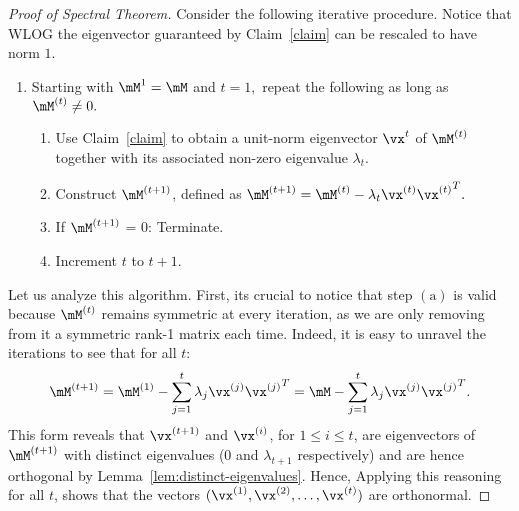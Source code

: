 \begin{proof}[Proof of Spectral Theorem]
Consider the following iterative procedure. Notice that WLOG the eigenvector guaranteed by Claim~\ref{claim} can be rescaled to have norm $1$.
\begin{enumerate}
\item Starting with $\mM^{1} = \mM$ and $t=1,$ repeat the following as long as $\mM^{(t)} \neq 0.$
	\begin{enumerate}
    \item Use Claim~\ref{claim} to obtain a unit-norm eigenvector $\vx^{t}$ of $\mM^{(t)}$ together with its associated non-zero eigenvalue $\lambda_t.$
    \item Construct $\mM^{(t+1)}$, defined as $\mM^{(t+1)} = \mM^{(t)} - \lambda_t \vx^{(t)} {\vx^{(t)}}^T.$
    \item If $\mM^{(t+1)}$ = 0: Terminate. 
    \item Increment $t$ to $t+1.$
	\end{enumerate}
\end{enumerate}
Let us analyze this algorithm. First, its crucial to notice that step $(\textrm{a})$ is valid because $\mM^{(t)}$ remains symmetric at every iteration, as we are only removing from it a symmetric rank-1 matrix each time.  Indeed, it is easy to unravel the iterations to see that for all $t$:
$$
\mM^{(t+1)} = \mM^{(1)} - \sum_{j=1}^t \lambda_j \vx^{(j)} {\vx^{(j)}}^T = \mM - \sum_{j=1}^t \lambda_j \vx^{(j)} {\vx^{(j)}}^T. 
$$
This form reveals that $\vx^{(t+1)}$ and $\vx^{(i)}$, for $1\leq i \leq t$, are eigenvectors of $\mM^{(t+1)}$ with distinct eigenvalues ($0$ and $\lambda_{t+1}$ respectively) and are hence orthogonal by Lemma~\ref{lem:distinct-eigenvalues}. Hence, 
Applying this reasoning for all $t$, shows that the vectors $(\vx^{(1)}, \vx^{(2)}, \ldots, \vx^{(t)})$ are orthonormal.




\end{proof}
